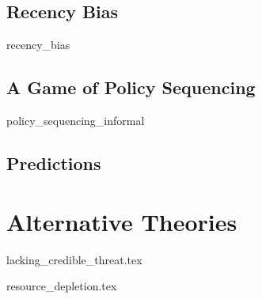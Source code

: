 \documentclass[hyphens, crop=false]{standalone}
\begin{document}
		\subsection*{Recency Bias}
			{recency_bias}
		
		
		\subsection*{A Game of Policy Sequencing}
			{policy_sequencing_informal}
		
		\subsection*{Predictions}
			
	\section*{Alternative Theories}
		
		{lacking_credible_threat.tex}
		
		{resource_depletion.tex}
		
%		
%		
			
\end{document}
